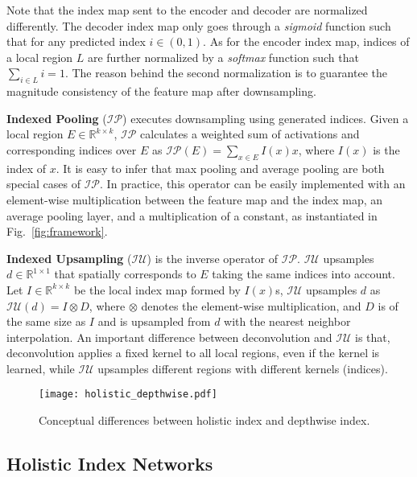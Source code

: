 \documentclass[10pt,twocolumn,letterpaper]{article}
\begin{document}
Note that the index map sent to the encoder and decoder are normalized differently. The decoder index map only goes through a \textit{sigmoid} function such that for any predicted index $i\in(0,1)$. As for the encoder index map, indices of a local region $L$ are further normalized by a \textit{softmax} function such that $\sum_{i\in{L}}i=1$. The reason behind the second normalization is to guarantee the magnitude consistency of the feature map after downsampling.

\vspace{5pt}
\noindent\textbf{Indexed Pooling} ($\mathcal{IP}$) executes downsampling using generated indices. Given a local region $E\in\mathbb{R}^{k\times k}$, $\mathcal{IP}$ calculates a weighted sum of activations and corresponding indices over $E$ as $\mathcal{IP}(E)=\sum_{x\in E}I(x)x$, where $I(x)$ is the index of $x$. It is easy to infer that max pooling and average pooling are both special cases of $\mathcal{IP}$. In practice, this operator can be easily implemented with an element-wise multiplication between the feature map and the index map, an average pooling layer, and a multiplication of a constant, as instantiated in Fig.~\ref{fig:framework}.

\vspace{5pt}
\noindent\textbf{Indexed Upsampling} ($\mathcal{IU}$) is the inverse operator of $\mathcal{IP}$. $\mathcal{IU}$ upsamples $d\in\mathbb{R}^{1\times 1}$ that spatially corresponds to $E$ taking the same indices into account. Let $I\in\mathbb{R}^{k\times k}$ be the local index map formed by $I(x)$s, $\mathcal{IU}$ upsamples $d$ as $\mathcal{IU}(d)=I\otimes D$, where $\otimes$ denotes the element-wise multiplication, and $D$ is of the same size as $I$ and is upsampled from $d$ with the nearest neighbor interpolation. An important difference between deconvolution and $\mathcal{IU}$ is that, deconvolution applies a fixed kernel to all local regions, even if the kernel is learned, while $\mathcal{IU}$ upsamples different regions with different kernels (indices).


\begin{figure}[!tb]
	\captionsetup{font=small,singlelinecheck=true}
	\setlength{\abovecaptionskip}{10pt}
	\centering
	\texttt{[image: holistic\_depthwise.pdf]}
\caption{Conceptual differences between holistic index and depthwise index.}
	\label{fig:holistic_depthwise}
\end{figure}

\subsection{Holistic Index Networks}\label{subsec:holistic_networks}
\end{document}
